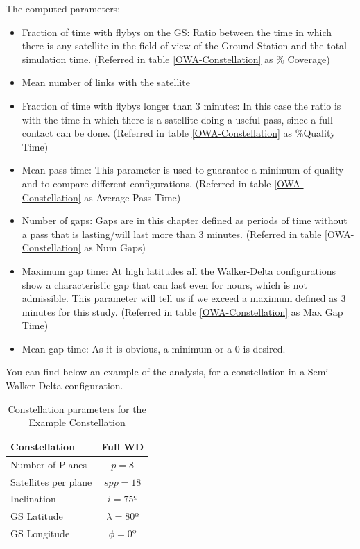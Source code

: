 The computed parameters:\label{PerfAnal}
\begin{itemize}
\item Fraction of time with flybys on the GS: Ratio between the time in which there is any satellite in the field of view of the Ground Station and the total simulation time. (Referred in table \ref{OWA-Constellation} as \% Coverage)
\item Mean number of links with the satellite
\item Fraction of time with flybys longer than 3 minutes: In this case the ratio is with the time in which there is a satellite doing a useful pass, since a full contact can be done. (Referred in table \ref{OWA-Constellation} as \%Quality Time) 
\item Mean pass time: This parameter is used to guarantee a minimum of quality and to compare different configurations. (Referred in table \ref{OWA-Constellation} as Average Pass Time)
\item Number of gaps: Gaps are in this chapter defined as periods of time without a pass that is lasting/will last more than 3 minutes. (Referred in table \ref{OWA-Constellation} as Num Gaps)
\item Maximum gap time: At high latitudes all the Walker-Delta configurations show a characteristic gap that can last even for hours, which is not admissible. This parameter will tell us if we exceed a maximum defined as 3 minutes for this study. (Referred in table \ref{OWA-Constellation} as Max Gap Time)
\item Mean gap time: As it is obvious, a minimum or a 0 is desired. 
\end{itemize}

You can find below an example of the analysis, for a constellation in a Semi Walker-Delta configuration.

\begin{table}[H]
\centering
\begin{tabular}{|l|c|}
\hline
Constellation & Full WD \\ \hline
Number of Planes     & $ p=8 $   \\ \hline
Satellites per plane   & $ spp=18 $ \\ \hline
Inclination  	 & $ i=75º $   \\ \hline
GS Latitude   & $ \lambda=80º$   \\ \hline
GS Longitude & $ \phi=0º $ \\ \hline
\end{tabular}
\caption{Constellation parameters for the Example Constellation}
\end{table}

